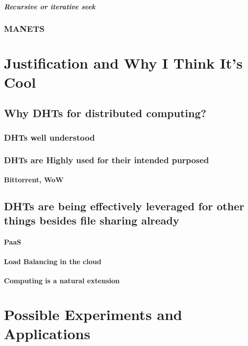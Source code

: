 \documentclass[10pt,letterpaper]{report}
\begin{document}
\paragraph{Recursive or iterative seek}


\subsection{MANETS}
\chapter{Justification and Why I Think It's Cool}

\section{Why DHTs for distributed computing?}
\subsection{DHTs well understood}
\subsection{DHTs are Highly used for their intended purposed}
\subsubsection{Bittorrent, WoW}
\section{DHTs are being effectively leveraged for other things besides file sharing already}

\subsubsection{PaaS}
\subsubsection{Load Balancing in the cloud}
\subsubsection{Computing is a natural extension}

\chapter{Possible Experiments and Applications}
\end{document}
